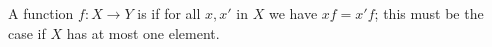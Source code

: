 A function $f: X \longrightarrow Y$ is  if for all $x, x'$ in $X$ we have $xf = x'f$; this must be the case if $X$ has at most one element.
